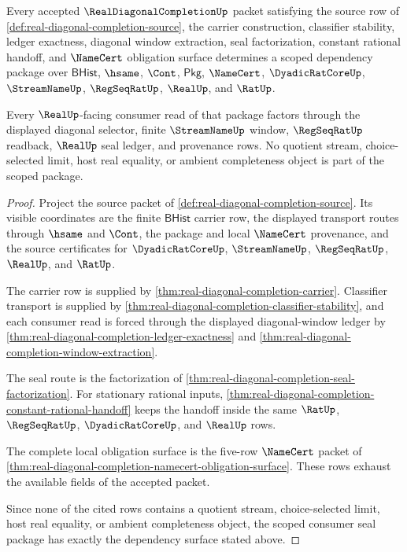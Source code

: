 \begin{theorem}
\label{thm:real-diagonal-completion-scoped-consumer-seal-package}
Every accepted $\RealDiagonalCompletionUp$ packet satisfying the source row of \autoref{def:real-diagonal-completion-source}, the carrier construction, classifier stability, ledger exactness, diagonal window extraction, seal factorization, constant rational handoff, and $\NameCert$ obligation surface determines a scoped dependency package over $\mathsf{BHist}$, $\hsame$, $\Cont$, $\mathsf{Pkg}$, $\NameCert$, $\DyadicRatCoreUp$, $\StreamNameUp$, $\RegSeqRatUp$, $\RealUp$, and $\RatUp$.

Every $\RealUp$-facing consumer read of that package factors through the displayed diagonal selector, finite $\StreamNameUp$ window, $\RegSeqRatUp$ readback, $\RealUp$ seal ledger, and provenance rows. No quotient stream, choice-selected limit, host real equality, or ambient completeness object is part of the scoped package.
\end{theorem}
\begin{proof}
Project the source packet of \autoref{def:real-diagonal-completion-source}. Its visible coordinates are the finite $\mathsf{BHist}$ carrier row, the displayed transport routes through $\hsame$ and $\Cont$, the package and local $\NameCert$ provenance, and the source certificates for $\DyadicRatCoreUp$, $\StreamNameUp$, $\RegSeqRatUp$, $\RealUp$, and $\RatUp$.

The carrier row is supplied by \autoref{thm:real-diagonal-completion-carrier}. Classifier transport is supplied by \autoref{thm:real-diagonal-completion-classifier-stability}, and each consumer read is forced through the displayed diagonal-window ledger by \autoref{thm:real-diagonal-completion-ledger-exactness} and \autoref{thm:real-diagonal-completion-window-extraction}.

The seal route is the factorization of \autoref{thm:real-diagonal-completion-seal-factorization}. For stationary rational inputs, \autoref{thm:real-diagonal-completion-constant-rational-handoff} keeps the handoff inside the same $\RatUp$, $\RegSeqRatUp$, $\DyadicRatCoreUp$, and $\RealUp$ rows.

The complete local obligation surface is the five-row $\NameCert$ packet of \autoref{thm:real-diagonal-completion-namecert-obligation-surface}. These rows exhaust the available fields of the accepted packet.

Since none of the cited rows contains a quotient stream, choice-selected limit, host real equality, or ambient completeness object, the scoped consumer seal package has exactly the dependency surface stated above.
\end{proof}

